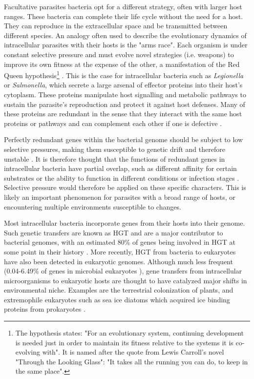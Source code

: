 Facultative parasites bacteria opt for a different strategy, often with larger host ranges. These bacteria can complete their life cycle without the need for a host. They can reproduce in the extracellular space and be transmitted between different species. An analogy often used to describe the evolutionary dynamics of intracellular parasites with their hosts is the "arms race". Each organism is under constant selective pressure and must evolve novel strategies (i.e. weapons) to improve its own fitness at the expense of the other, a manifestation of the Red Queen hypothesis\footnote{The hypothesis  states: "For an evolutionary system, continuing development is needed just in order to maintain its fitness relative to the systems it is co-evolving with". It is named after the quote from Lewis Carroll's novel "Through the Looking Glass": "It takes all the running you can do, to keep in the same place".} \cite{vanvalenNEWEVOLUTIONARYLAW1973,holmgrenOutrunningRedQueen2017}. This is the case for intracellular bacteria such as \textit{Legionella} or \textit{Salmonella}, which secrete a large arsenal of effector proteins into their host's cytoplasm. These proteins manipulate host signalling and metabolic pathways to sustain the parasite's reproduction and protect it against host defenses. Many of these proteins are redundant in the sense that they interact with the same host proteins or pathways and can complement each other if one is defective \cite{ghoshParalogsMultipleLayers2017}.

Perfectly redundant genes within the bacterial genome should be subject to low selective pressures, making them susceptible to genetic drift and therefore unstable \cite{bergthorssonOhnoDilemmaEvolution2007}. It is therefore thought that the functions of redundant genes in intracellular bacteria have partial overlap, such as different affinity for certain substrates or the ability to function in different conditions or infection stages \cite{ghoshParalogsMultipleLayers2017}. Selective pressure would therefore be applied on these specific characters. This is likely an important phenomenon for parasites with a broad range of hosts, or encountering multiple environments susceptible to changes.

Most intracellular bacteria incorporate genes from their hosts into their genome. Such genetic transfers are known as \acrfull{HGT} and are a major contributor to bacterial genomes, with an estimated 80\% of genes being involved in HGT at some point in their history \cite{daganModularNetworksCumulative2008}. More recently, HGT from bacteria to eukaryotes have also been detected in eukaryotic genomes. Although much less frequent (0.04-6.49\% of genes in microbial eukaryotes \cite{vanettenHorizontalGeneTransfer2020}), gene transfers from intracellular microorganisms to eukaryotic hosts are thought to have catalyzed major shifts in environmental niche. Examples are the terrestrial colonization of plants, and extremophile eukaryotes such as sea ice diatoms which acquired ice binding proteins from prokaryotes \cite{vanettenHorizontalGeneTransfer2020}.

